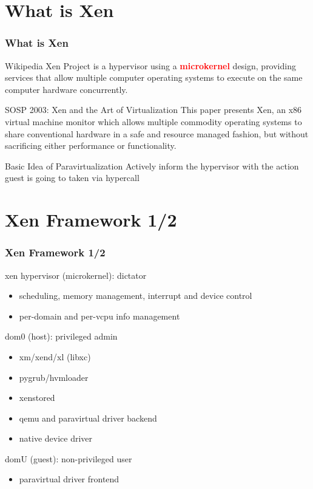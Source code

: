 \documentclass[aspectratio=169]{beamer}
\begin{document}

\section {What is Xen}
\begin{frame}
\frametitle{What is Xen}
\begin{block}{Wikipedia}
Xen Project is a hypervisor using a \textbf{\textcolor{red}{microkernel}} design, providing services that allow multiple computer operating systems to execute on the same computer hardware concurrently.
\end{block} \pause
\begin{block}{SOSP 2003: Xen and the Art of Virtualization}
This paper presents Xen, an x86 virtual machine monitor which allows multiple commodity operating systems to share conventional hardware in a safe and resource managed fashion, but without sacrificing either performance or functionality. \pause
\end{block}
\begin{block}{Basic Idea of Paravirtualization}
Actively inform the hypervisor with the action guest is going to taken via hypercall
\end{block}
\end{frame}


\section{Xen Framework 1/2}
\begin{frame}
\frametitle{Xen Framework 1/2}
\begin{block}{xen hypervisor (microkernel): dictator}
\begin{itemize}
\item scheduling, memory management, interrupt and device control
\item per-domain and per-vcpu info management
\end{itemize}
\end{block} \pause
\begin{block}{dom0 (host): privileged admin}
\begin{itemize}
\item xm/xend/xl (libxc)
\item pygrub/hvmloader
\item xenstored
\item qemu and paravirtual driver backend
\item native device driver
\end{itemize}
\end{block} \pause
\begin{block}{domU (guest): non-privileged user}
\begin{itemize}
\item paravirtual driver frontend
\end{itemize}
\end{block}
\end{frame}
\end{document}
